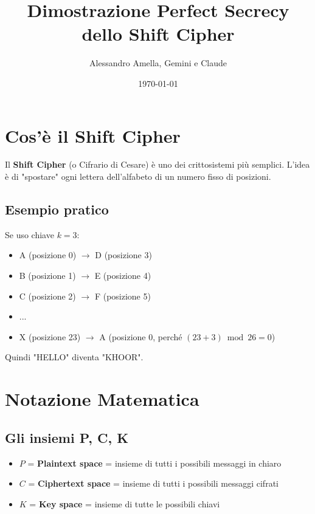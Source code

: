 

\title{Dimostrazione Perfect Secrecy dello Shift Cipher}
\author{Alessandro Amella, Gemini e Claude}
\date{\today}



\maketitle

\section{Cos'è il Shift Cipher}

Il \textbf{Shift Cipher} (o Cifrario di Cesare) è uno dei crittosistemi più semplici. L'idea è di "spostare" ogni lettera dell'alfabeto di un numero fisso di posizioni.

\subsection{Esempio pratico}
Se uso chiave $k = 3$:
\begin{itemize}
    \item A (posizione 0) $\to$ D (posizione 3)
    \item B (posizione 1) $\to$ E (posizione 4)  
    \item C (posizione 2) $\to$ F (posizione 5)
    \item ...
    \item X (posizione 23) $\to$ A (posizione 0, perché $(23+3) \bmod 26 = 0$)
\end{itemize}

Quindi "HELLO" diventa "KHOOR".

\section{Notazione Matematica}

\subsection{Gli insiemi P, C, K}
\begin{itemize}
    \item $P$ = \textbf{Plaintext space} = insieme di tutti i possibili messaggi in chiaro
    \item $C$ = \textbf{Ciphertext space} = insieme di tutti i possibili messaggi cifrati  
    \item $K$ = \textbf{Key space} = insieme di tutte le possibili chiavi
\end{itemize}

